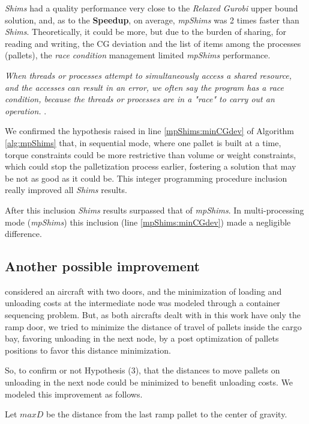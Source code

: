 \documentclass[preprint,authoryear]{elsarticle}
\begin{document}
{\it Shims} had a quality performance very close to the {\it Relaxed Gurobi} upper bound solution, and, as to the {\bf Speedup}, on average, {\it mpShims} was 2 times faster than {\it Shims}. Theoretically, it could be more, but due to the burden of sharing, for reading and writing, the CG deviation and the list of items among the processes (pallets), the {\it race condition} management limited {\it mpShims} performance.

{\it When threads or processes attempt to simultaneously access a shared resource, and the accesses can result in an error, we often say the program has a race condition, because the threads or processes are in a "race" to carry out an operation.} \cite[p. 53]{Pacheco:2020}.

We confirmed the hypothesis raised in line \ref{mpShims:minCGdev} of Algorithm \ref{alg:mpShims} that, in sequential mode, where one pallet is built at a time, torque constraints could be more restrictive than volume or weight constraints, which could stop the palletization process earlier, fostering a solution that may be not as good as it could be. This integer programming procedure inclusion really improved all {\it Shims} results.

After this inclusion {\it Shims} results surpassed that of {\it mpShims}. In multi-processing mode ({\it mpShims}) this inclusion (line \ref{mpShims:minCGdev}) made a negligible difference.

\subsection{Another possible improvement}
\label{improvement}

\cite{LurkinSchyns2015} considered an aircraft with two doors, and the minimization of loading and unloading costs at the intermediate node was modeled through a container sequencing problem. But, as both aircrafts dealt with in this work have only the ramp door, we tried to minimize the distance of travel of pallets inside the cargo bay, favoring unloading in the next node, by a post optimization of pallets positions to favor this distance minimization.

So, to confirm or not Hypothesis (3), that the distances to move pallets on unloading in the next node could be minimized to benefit unloading costs. We modeled this improvement as follows.

Let $maxD$ be the distance from the last ramp pallet to the center of gravity.
\end{document}
